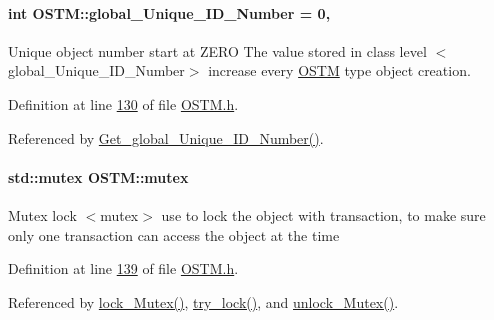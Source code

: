 \paragraph[{\texorpdfstring{global\+\_\+\+Unique\+\_\+\+I\+D\+\_\+\+Number}{global_Unique_ID_Number}}]{\setlength{\rightskip}{0pt plus 5cm}int O\+S\+T\+M\+::global\+\_\+\+Unique\+\_\+\+I\+D\+\_\+\+Number = 0\hspace{0.3cm}{\ttfamily [static]}, {\ttfamily [private]}}\hypertarget{class_o_s_t_m_acb617b9666d198c0de333c8613df0d4b_acb617b9666d198c0de333c8613df0d4b}{}\label{class_o_s_t_m_acb617b9666d198c0de333c8613df0d4b_acb617b9666d198c0de333c8613df0d4b}
Unique object number start at Z\+E\+RO The value stored in class level $<$global\+\_\+\+Unique\+\_\+\+I\+D\+\_\+\+Number$>$ increase every \hyperlink{class_o_s_t_m}{O\+S\+TM} type object creation. 

Definition at line \hyperlink{_o_s_t_m_8h_source_l00130}{130} of file \hyperlink{_o_s_t_m_8h_source}{O\+S\+T\+M.\+h}.



Referenced by \hyperlink{_o_s_t_m_8cpp_source_l00061}{Get\+\_\+global\+\_\+\+Unique\+\_\+\+I\+D\+\_\+\+Number()}.

\paragraph[{\texorpdfstring{mutex}{mutex}}]{\setlength{\rightskip}{0pt plus 5cm}std\+::mutex O\+S\+T\+M\+::mutex\hspace{0.3cm}{\ttfamily [private]}}\hypertarget{class_o_s_t_m_aaab0921fd1564b793f882a5002ec7106_aaab0921fd1564b793f882a5002ec7106}{}\label{class_o_s_t_m_aaab0921fd1564b793f882a5002ec7106_aaab0921fd1564b793f882a5002ec7106}
Mutex lock $<$mutex$>$ use to lock the object with transaction, to make sure only one transaction can access the object at the time 

Definition at line \hyperlink{_o_s_t_m_8h_source_l00139}{139} of file \hyperlink{_o_s_t_m_8h_source}{O\+S\+T\+M.\+h}.



Referenced by \hyperlink{_o_s_t_m_8cpp_source_l00147}{lock\+\_\+\+Mutex()}, \hyperlink{_o_s_t_m_8cpp_source_l00162}{try\+\_\+lock()}, and \hyperlink{_o_s_t_m_8cpp_source_l00154}{unlock\+\_\+\+Mutex()}.

